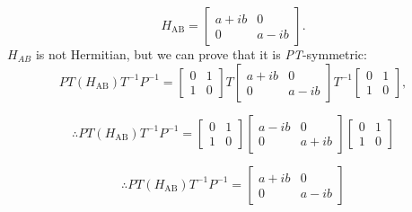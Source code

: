 \documentclass[10pt, a4paper, singlespacing, headsepline]{report}
\newcommand\PT{\emph{PT}}
\begin{document}
\begin{equation} \label{eq:5}
H_{\mathrm{AB}} = \begin{bmatrix}
a+ib & 0 \\ 
0 & a-ib
\end{bmatrix}.
\end{equation}
$H_{AB}$ is not Hermitian, but we can prove that it is \PT-symmetric:
\begin{equation} \label{eq:6}
PT(H_{\mathrm{AB}})T^{-1}P^{-1} = \begin{bmatrix}
0 & 1 \\ 
1 & 0
\end{bmatrix}
T
\begin{bmatrix}
a+ib & 0 \\ 
0 & a-ib
\end{bmatrix}
T^{-1}
\begin{bmatrix}
0 & 1 \\ 
1 & 0
\end{bmatrix},
\end{equation}

\begin{equation} \label{eq:7}
\therefore PT(H_{\mathrm{AB}})T^{-1}P^{-1} = \begin{bmatrix}
0 & 1 \\ 
1 & 0
\end{bmatrix}
\begin{bmatrix}
a-ib & 0 \\ 
0 & a+ib
\end{bmatrix}
\begin{bmatrix}
0 & 1 \\ 
1 & 0
\end{bmatrix}
\end{equation}

\begin{equation} \label{eq:8}
\therefore PT(H_{\mathrm{AB}})T^{-1}P^{-1} = 
\begin{bmatrix}
a+ib & 0 \\ 
0 & a-ib
\end{bmatrix}
\end{equation}
\end{document}
